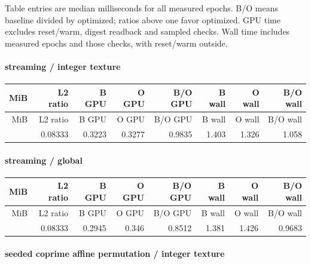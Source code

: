 Table entries are median milliseconds for all measured epochs. B/O means baseline divided by optimized; ratios above one favor optimized. GPU time excludes reset/warm, digest readback and sampled checks. Wall time includes measured epochs and those checks, with reset/warm outside.


\paragraph{streaming / integer texture}

\begingroup
\scriptsize
\setlength{\tabcolsep}{2.5pt}
\renewcommand{\arraystretch}{1.16}
\begin{longtable}{rrrrrrrr}
\toprule
MiB & L2 ratio & B GPU & O GPU & B/O GPU & B wall & O wall & B/O wall \\
\midrule\endfirsthead
\toprule
MiB & L2 ratio & B GPU & O GPU & B/O GPU & B wall & O wall & B/O wall \\
\midrule\endhead
\bottomrule\endfoot
3 & 0.08333 & 0.3223 & 0.3277 & 0.9835 & 1.403 & 1.326 & 1.058 \\
\end{longtable}
\endgroup


\paragraph{streaming / global}

\begingroup
\scriptsize
\setlength{\tabcolsep}{2.5pt}
\renewcommand{\arraystretch}{1.16}
\begin{longtable}{rrrrrrrr}
\toprule
MiB & L2 ratio & B GPU & O GPU & B/O GPU & B wall & O wall & B/O wall \\
\midrule\endfirsthead
\toprule
MiB & L2 ratio & B GPU & O GPU & B/O GPU & B wall & O wall & B/O wall \\
\midrule\endhead
\bottomrule\endfoot
3 & 0.08333 & 0.2945 & 0.346 & 0.8512 & 1.381 & 1.426 & 0.9683 \\
\end{longtable}
\endgroup


\paragraph{seeded coprime affine permutation / integer texture}

